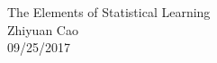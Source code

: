 \documentclass[12pt]{article}
\begin{document}
\begin{flushright}
	The Elements of Statistical Learning\\
	Zhiyuan Cao \\ 
	09/25/2017  
\end{flushright}	
	



\end{document}
